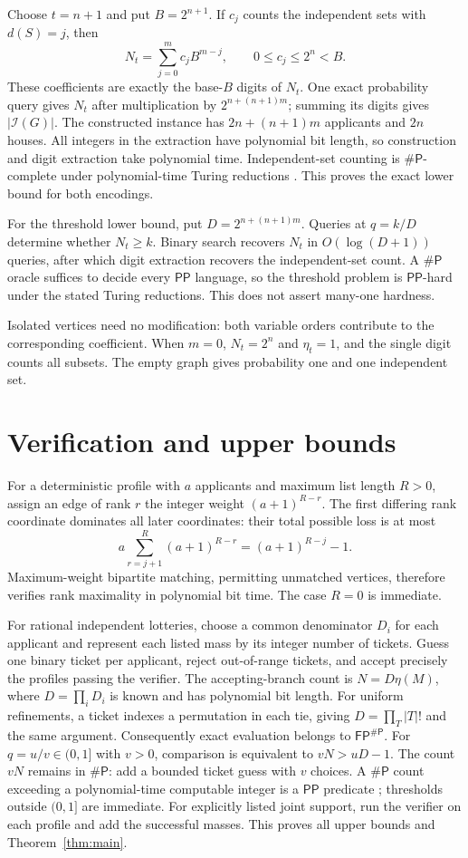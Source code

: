 \documentclass[10pt]{article}
\newcommand{\IS}{\mathcal I}
\newcommand{\FP}{\mathsf{FP}}
\newcommand{\PP}{\mathsf{PP}}
\newcommand{\sharpP}{\mathsf{\#P}}
\begin{document}
Choose $t=n+1$ and put $B=2^{n+1}$. If $c_j$ counts the independent
sets with $d(S)=j$, then
\[
 N_t=\sum_{j=0}^{m}c_jB^{m-j},\qquad 0\leq c_j\leq2^n<B.
\]
These coefficients are exactly the base-$B$ digits of $N_t$.
One exact probability query gives $N_t$ after multiplication by
$2^{n+(n+1)m}$; summing its digits gives $|\IS(G)|$.
The constructed instance has $2n+(n+1)m$ applicants and $2n$ houses.
All integers in the extraction have polynomial bit length, so construction
and digit extraction take polynomial time. Independent-set counting is
$\sharpP$-complete under polynomial-time Turing reductions
\cite[\S1, problem 2; \S2, reduction 2]{provan}.
This proves the exact lower bound for both encodings.

For the threshold lower bound, put $D=2^{n+(n+1)m}$.
Queries at $q=k/D$ determine whether $N_t\geq k$. Binary search
recovers $N_t$ in $O(\log(D+1))$ queries, after which digit extraction
recovers the independent-set count. A $\sharpP$ oracle suffices to decide
every $\PP$ language, so the threshold problem is $\PP$-hard under
the stated Turing reductions. This does not assert many-one hardness.

Isolated vertices need no modification: both variable orders contribute
to the corresponding coefficient. When $m=0$, $N_t=2^n$ and $\eta_t=1$,
and the single digit counts all subsets. The empty graph gives probability
one and one independent set.

\section*{Verification and upper bounds}
For a deterministic profile with $a$ applicants and maximum list length
$R>0$, assign an edge of rank $r$ the integer weight
$(a+1)^{R-r}$. The first differing rank coordinate dominates all later
coordinates: their total possible loss is at most
\[
 a\sum_{r=j+1}^{R}(a+1)^{R-r}=(a+1)^{R-j}-1.
\]
Maximum-weight bipartite matching, permitting unmatched vertices, therefore
verifies rank maximality in polynomial bit time. The case $R=0$ is immediate.

For rational independent lotteries, choose a common denominator $D_i$
for each applicant and represent each listed mass by its integer number
of tickets. Guess one binary ticket per applicant, reject out-of-range
tickets, and accept precisely the profiles passing the verifier. The
accepting-branch count is $N=D\eta(M)$, where $D=\prod_iD_i$ is known
and has polynomial bit length. For uniform refinements, a ticket indexes
a permutation in each tie, giving $D=\prod_T|T|!$ and the same argument.
Consequently exact evaluation belongs to $\FP^{\sharpP}$. For
$q=u/v\in(0,1]$ with $v>0$, comparison is equivalent to
$vN>uD-1$. The count $vN$ remains in $\sharpP$: add a bounded ticket
guess with $v$ choices. A $\sharpP$ count exceeding a polynomial-time
computable integer is a $\PP$ predicate
\cite[Definition 2.3]{fenner}; thresholds outside $(0,1]$ are immediate.
For explicitly listed joint support,
run the verifier on each profile and add the successful masses.
This proves all upper bounds and Theorem~\ref{thm:main}.
\end{document}
